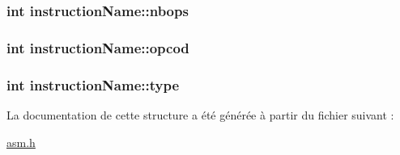 \subsubsection[{\texorpdfstring{nbops}{nbops}}]{\setlength{\rightskip}{0pt plus 5cm}int instruction\+Name\+::nbops}\hypertarget{structinstructionName_aecc3848e91d527de92cea2cd25c652d4}{}\label{structinstructionName_aecc3848e91d527de92cea2cd25c652d4}
\subsubsection[{\texorpdfstring{opcod}{opcod}}]{\setlength{\rightskip}{0pt plus 5cm}int instruction\+Name\+::opcod}\hypertarget{structinstructionName_a56fd802379b5c3d00a83cf4915b14de7}{}\label{structinstructionName_a56fd802379b5c3d00a83cf4915b14de7}
\subsubsection[{\texorpdfstring{type}{type}}]{\setlength{\rightskip}{0pt plus 5cm}int instruction\+Name\+::type}\hypertarget{structinstructionName_a343ced7f4083a1a399a5195b5c6bc8a8}{}\label{structinstructionName_a343ced7f4083a1a399a5195b5c6bc8a8}


La documentation de cette structure a été générée à partir du fichier suivant \+:\begin{DoxyCompactItemize}
\item 
\hyperlink{asm_8h}{asm.\+h}\end{DoxyCompactItemize}

